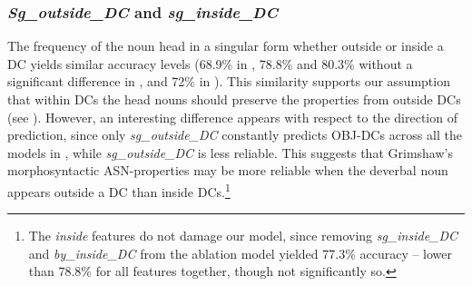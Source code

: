 \documentclass[output=paper]{langsci/langscibook}
\begin{document}
\subsubsection{\textit{Sg\_outside\_DC} and \textit{sg\_inside\_DC}}
The frequency of the noun head in a singular form whether outside or inside a DC yields similar accuracy levels (68.9\% in , 78.8\% and 80.3\% without a significant difference in , and 72\% in ). This similarity supports our assumption that within DCs the head nouns should preserve the properties from outside DCs   {(see )}. However, an interesting difference appears with respect to the direction of prediction, since only \textit{sg\_outside\_DC} constantly predicts OBJ-DCs across all the models in , while \textit{sg\_outside\_DC} is less reliable. This suggests that Grimshaw's morphosyntactic ASN-properties may be more reliable when the deverbal noun appears outside a DC than inside DCs.\footnote{ {The \textit{inside} features do not damage our model,} since removing \textit{sg\_inside\_DC} and \textit{by\_inside\_DC} from the ablation model yielded 77.3\% accuracy -- lower than 78.8\% for all features together, though not significantly so.} 
\end{document}
